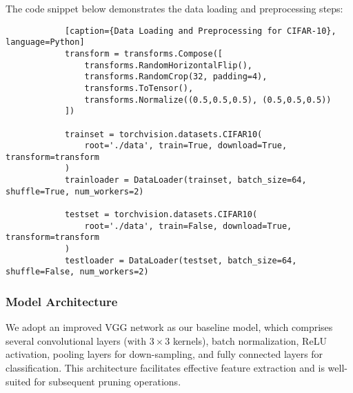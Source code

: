             The code snippet below demonstrates the data loading and preprocessing steps:
            \begin{lstlisting}
            [caption={Data Loading and Preprocessing for CIFAR-10}, language=Python]
            transform = transforms.Compose([
                transforms.RandomHorizontalFlip(),
                transforms.RandomCrop(32, padding=4),
                transforms.ToTensor(),
                transforms.Normalize((0.5,0.5,0.5), (0.5,0.5,0.5))
            ])
            
            trainset = torchvision.datasets.CIFAR10(
                root='./data', train=True, download=True, transform=transform
            )
            trainloader = DataLoader(trainset, batch_size=64, shuffle=True, num_workers=2)
            
            testset = torchvision.datasets.CIFAR10(
                root='./data', train=False, download=True, transform=transform
            )
            testloader = DataLoader(testset, batch_size=64, shuffle=False, num_workers=2)
            \end{lstlisting}
        
        \subsubsection{Model Architecture}
            We adopt an improved VGG network as our baseline model, which comprises several convolutional layers (with $3 \times 3$ kernels), batch normalization, ReLU activation, pooling layers for down-sampling, and fully connected layers for classification. This architecture facilitates effective feature extraction and is well-suited for subsequent pruning operations.
            
